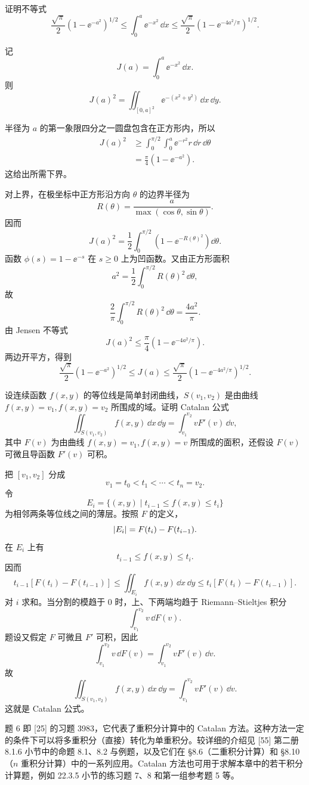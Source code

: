 \begin{xreferenceproblem}[5]
证明不等式
  \[
    \frac{\sqrt\pi}{2}\left(1-\ee^{-a^2}\right)^{1/2}
    \le\int_0^a\ee^{-x^2}\,\dd x
    \le\frac{\sqrt\pi}{2}\left(1-\ee^{-4a^2/\pi}\right)^{1/2}.
  \]
\end{xreferenceproblem}
\begin{xsolution}
记
\[
  J(a)=\int_0^a\ee^{-x^2}\,\dd x.
\]
则
\[
  J(a)^2=\iint_{[0,a]^2}\ee^{-(x^2+y^2)}\,\dd x\,\dd y.
\]

半径为 $a$ 的第一象限四分之一圆盘包含在正方形内，所以
\begin{align*}
  J(a)^2
  &\ge\int_0^{\pi/2}\int_0^a\ee^{-r^2}r\,\dd r\,\dd\theta\\
  &=\frac\pi4(1-\ee^{-a^2}).
\end{align*}
这给出所需下界。

对上界，在极坐标中正方形沿方向 $\theta$ 的边界半径为
\[
  R(\theta)=\frac{a}{\max(\cos\theta,\sin\theta)}.
\]
因而
\[
  J(a)^2=\frac12\int_0^{\pi/2}
  \left(1-\ee^{-R(\theta)^2}\right)\dd\theta.
\]
函数 $\phi(s)=1-\ee^{-s}$ 在 $s\ge0$ 上为凹函数。又由正方形面积
\[
  a^2=\frac12\int_0^{\pi/2}R(\theta)^2\,\dd\theta,
\]
故
\[
  \frac2\pi\int_0^{\pi/2}R(\theta)^2\,\dd\theta
  =\frac{4a^2}{\pi}.
\]
由 Jensen 不等式
\[
  J(a)^2\le\frac\pi4
  \left(1-\ee^{-4a^2/\pi}\right).
\]
两边开平方，得到
\[
  \boxed{
  \frac{\sqrt\pi}{2}(1-\ee^{-a^2})^{1/2}
  \le J(a)\le
  \frac{\sqrt\pi}{2}(1-\ee^{-4a^2/\pi})^{1/2}}.
\]
\end{xsolution}


\begin{xreferenceproblem}[6]
设连续函数 $f(x,y)$ 的等位线是简单封闭曲线，$S(v_1,v_2)$ 是由曲线 $f(x,y)=v_1,f(x,y)=v_2$ 所围成的域。证明 Catalan 公式
  \[
    \iint_{S(v_1,v_2)}f(x,y)\,\dd x\,\dd y
    =\int_{v_1}^{v_2}vF'(v)\,\dd v,
  \]
  其中 $F(v)$ 为由曲线 $f(x,y)=v_1,f(x,y)=v$ 所围成的面积，还假设 $F(v)$ 可微且导函数 $F'(v)$ 可积。
\end{xreferenceproblem}
\begin{xsolution}
把 $[v_1,v_2]$ 分成
\[
  v_1=t_0<t_1<\cdots<t_n=v_2.
\]
令
\[
  E_i=\{(x,y)\mid t_{i-1}\le f(x,y)\le t_i\}
\]
为相邻两条等位线之间的薄层。按照 $F$ 的定义，
\[
  \lvert E_i\rvert=F(t_i)-F(t_{i-1}).
\]
在 $E_i$ 上有
\[
  t_{i-1}\le f(x,y)\le t_i.
\]
因而
\[
  t_{i-1}[F(t_i)-F(t_{i-1})]
  \le\iint_{E_i}f(x,y)\,\dd x\,\dd y
  \le t_i[F(t_i)-F(t_{i-1})].
\]
对 $i$ 求和。当分割的模趋于 $0$ 时，上、下两端均趋于 Riemann--Stieltjes 积分
\[
  \int_{v_1}^{v_2}v\,\dd F(v).
\]
题设又假定 $F$ 可微且 $F'$ 可积，因此
\[
  \int_{v_1}^{v_2}v\,\dd F(v)
  =\int_{v_1}^{v_2}vF'(v)\,\dd v.
\]
故
\[
  \boxed{
  \iint_{S(v_1,v_2)}f(x,y)\,\dd x\,\dd y
  =\int_{v_1}^{v_2}vF'(v)\,\dd v}.
\]
这就是 Catalan 公式。
\end{xsolution}


\begin{xremark}
题 6 即 [25] 的习题 3983，它代表了重积分计算中的 Catalan 方法。这种方法一定的条件下可以将多重积分（直接）转化为单重积分。较详细的介绍见 [55] 第二册 8.1.6 小节中的命题 8.1、8.2 与例题，以及它们在 §8.6（二重积分计算）和 §8.10（$n$ 重积分计算）中的一系列应用。Catalan 方法也可用于求解本章中的若干积分计算题，例如 22.3.5 小节的练习题 7、8 和第一组参考题 5 等。
\end{xremark}
